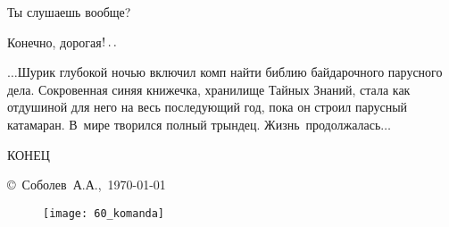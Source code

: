 {\diagdash Ты слушаешь вообще?

\diagdash Конечно, дорогая$\exldots$%

$\ldots$Шурик глубокой ночью включил комп найти библию байдарочного парусного дела\cite{Перегудов}. Сокровенная синяя книжечка, хранилище Тайных Знаний, стала как отдушиной для него на весь последующий год, пока он строил парусный катамаран. В~мире творился полный трындец. Жизнь~продолжалась$\ldots$


%


\begin{center}
\end{center}

\begin{center}
	\Large {КОНЕЦ}
\end{center}
}

\vspace*{\fill}
\begin{flushright}
	\copyright~Соболев~А.А.,~\today\\
\end{flushright}







\fancyhead[LE]{\fancyplain{}{}}
\fancyhead[RO]{\fancyplain{}{}}

\vspace*{4.0em}

\begin{figure}[!h]
	\centering
	\texttt{[image: 60\_komanda]}
\end{figure}



